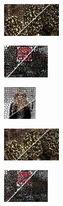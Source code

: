 \begin{figure}
	\begin{subfigure}[b]{0.02\textwidth}
	\end{subfigure}
	\begin{subfigure}[b]{0.16\textwidth}
		\includegraphics[height=1.65cm]{pictures/bsds500/ccs/cropped/ccs_208078_contours}
	\end{subfigure}
	\begin{subfigure}[b]{0.129\textwidth}
		\includegraphics[height=1.65cm]{pictures/sbd/ccs/cropped/ccs_6000067_contours}
	\end{subfigure}
	\begin{subfigure}[b]{0.10\textwidth}
		\includegraphics[height=1.65cm]{pictures/fash/ccs/cropped/ccs_132_contours}
	\end{subfigure}
	\begin{subfigure}[b]{0.02\textwidth}
	\end{subfigure}
	\begin{subfigure}[b]{0.16\textwidth}
		\includegraphics[height=1.65cm]{pictures/bsds500/cw/cropped/cw_208078_contours}
	\end{subfigure}
	\begin{subfigure}[b]{0.129\textwidth}
		\includegraphics[height=1.65cm]{pictures/sbd/cw/cropped/cw_6000067_contours}
	\end{subfigure}

\end{figure}
